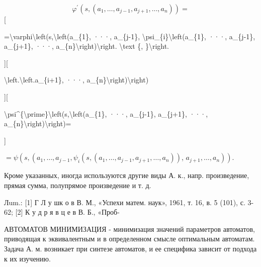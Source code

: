 \documentclass[10pt]{article}
\begin{document}
\[

\varphi^{\prime}\left(s,\left(a_{1}, \ldots, a_{j-1}, a_{j+1}, \ldots, a_{n}\right)\right)=

\][



=\textbackslash varphi\textbackslash left(s,\textbackslash left(a\_\{1\}, ···, a\_\{j-1\}, \textbackslash psi\_\{i\}\textbackslash left(a\_\{1\}, ···, a\_\{j-1\}, a\_\{j+1\}, ···, a\_\{n\}\textbackslash right)\textbackslash right. \textbackslash text \{, \}\textbackslash right.



][



\textbackslash left.\textbackslash left.a\_\{i+1\}, ···, a\_\{n\}\textbackslash right)\textbackslash right)



][



\textbackslash psi\^{}\{\textbackslash prime\}\textbackslash left(s,\textbackslash left(a\_\{1\}, ···, a\_\{j-1\}, a\_\{j+1\}, ···, a\_\{n\}\textbackslash right)\textbackslash right)=

]



$=\psi\left(s,\left(a_{1}, \ldots, a_{j-1}, \psi_{i}\left(s,\left(a_{1}, \ldots, a_{j-1}, a_{j+1}, \ldots, a_{n}\right)\right)\right.\right.$, $\left.\left.a_{j+1}, \ldots, a_{n}\right)\right)$.



Кроме указанных, иногда используются другие виды А. к., напр. произведение, прямая сумма, полупрямое произведение и т. д.



Лum.: [1] Г Л у шк о в В. М., «Успехи матем. наук», 1961, т. 16, в. 5 (101), с. 3-62; [2] К у д р я в ц е в В. Б., «Проб-



АВТОМАТОВ МИНИМИЗАЦИЯ - минимизация значений параметров автоматов, приводящая к эквивалентным и в определенном смысле оптимальным автоматам. Задача А. м. возникает при синтезе автоматов, и ее специфика зависит от подхода к их изучению.
\end{document}
